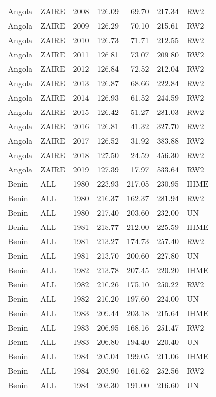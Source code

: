 \begin{longtable}{lllrrrl}
  Angola & ZAIRE & 2008 & 126.09 & 69.70 & 217.34 & RW2 \\ 
  Angola & ZAIRE & 2009 & 126.29 & 70.10 & 215.61 & RW2 \\ 
  Angola & ZAIRE & 2010 & 126.73 & 71.71 & 212.55 & RW2 \\ 
  Angola & ZAIRE & 2011 & 126.81 & 73.07 & 209.80 & RW2 \\ 
  Angola & ZAIRE & 2012 & 126.84 & 72.52 & 212.04 & RW2 \\ 
  Angola & ZAIRE & 2013 & 126.87 & 68.66 & 222.84 & RW2 \\ 
  Angola & ZAIRE & 2014 & 126.93 & 61.52 & 244.59 & RW2 \\ 
  Angola & ZAIRE & 2015 & 126.42 & 51.27 & 281.03 & RW2 \\ 
  Angola & ZAIRE & 2016 & 126.81 & 41.32 & 327.70 & RW2 \\ 
  Angola & ZAIRE & 2017 & 126.52 & 31.92 & 383.88 & RW2 \\ 
  Angola & ZAIRE & 2018 & 127.50 & 24.59 & 456.30 & RW2 \\ 
  Angola & ZAIRE & 2019 & 127.39 & 17.97 & 533.64 & RW2 \\ 
  Benin & ALL & 1980 & 223.93 & 217.05 & 230.95 & IHME \\ 
  Benin & ALL & 1980 & 216.37 & 162.37 & 281.94 & RW2 \\ 
  Benin & ALL & 1980 & 217.40 & 203.60 & 232.00 & UN \\ 
  Benin & ALL & 1981 & 218.77 & 212.00 & 225.59 & IHME \\ 
  Benin & ALL & 1981 & 213.27 & 174.73 & 257.40 & RW2 \\ 
  Benin & ALL & 1981 & 213.70 & 200.60 & 227.80 & UN \\ 
  Benin & ALL & 1982 & 213.78 & 207.45 & 220.20 & IHME \\ 
  Benin & ALL & 1982 & 210.26 & 175.10 & 250.22 & RW2 \\ 
  Benin & ALL & 1982 & 210.20 & 197.60 & 224.00 & UN \\ 
  Benin & ALL & 1983 & 209.44 & 203.18 & 215.64 & IHME \\ 
  Benin & ALL & 1983 & 206.95 & 168.16 & 251.47 & RW2 \\ 
  Benin & ALL & 1983 & 206.80 & 194.40 & 220.40 & UN \\ 
  Benin & ALL & 1984 & 205.04 & 199.05 & 211.06 & IHME \\ 
  Benin & ALL & 1984 & 203.90 & 161.62 & 252.56 & RW2 \\ 
  Benin & ALL & 1984 & 203.30 & 191.00 & 216.60 & UN \\ 

\end{longtable}
